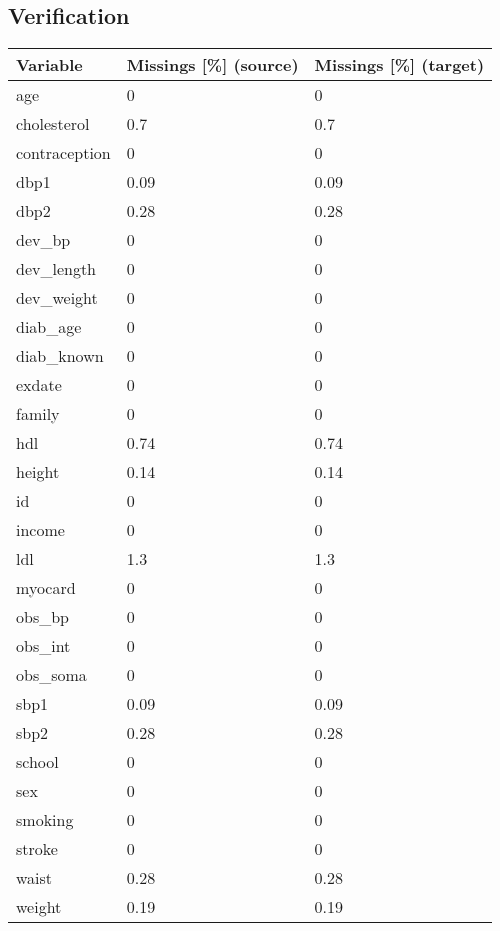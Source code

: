 \documentclass[
]{article}
\begin{document}
\hypertarget{verification}{%
\subsection{Verification}\label{verification}}

\begin{table}[H]
\centering
\begin{tabular}{l|l|l}
\hline
\textbf{Variable} & \textbf{Missings [\%] (source)} & \textbf{Missings [\%] (target)}\\
\hline
age & 0 & 0\\
\hline
cholesterol & 0.7 & 0.7\\
\hline
contraception & 0 & 0\\
\hline
dbp1 & 0.09 & 0.09\\
\hline
dbp2 & 0.28 & 0.28\\
\hline
dev\_bp & 0 & 0\\
\hline
dev\_length & 0 & 0\\
\hline
dev\_weight & 0 & 0\\
\hline
diab\_age & 0 & 0\\
\hline
diab\_known & 0 & 0\\
\hline
exdate & 0 & 0\\
\hline
family & 0 & 0\\
\hline
hdl & 0.74 & 0.74\\
\hline
height & 0.14 & 0.14\\
\hline
id & 0 & 0\\
\hline
income & 0 & 0\\
\hline
ldl & 1.3 & 1.3\\
\hline
myocard & 0 & 0\\
\hline
obs\_bp & 0 & 0\\
\hline
obs\_int & 0 & 0\\
\hline
obs\_soma & 0 & 0\\
\hline
sbp1 & 0.09 & 0.09\\
\hline
sbp2 & 0.28 & 0.28\\
\hline
school & 0 & 0\\
\hline
sex & 0 & 0\\
\hline
smoking & 0 & 0\\
\hline
stroke & 0 & 0\\
\hline
waist & 0.28 & 0.28\\
\hline
weight & 0.19 & 0.19\\
\hline
\end{tabular}
\end{table}
\end{document}
